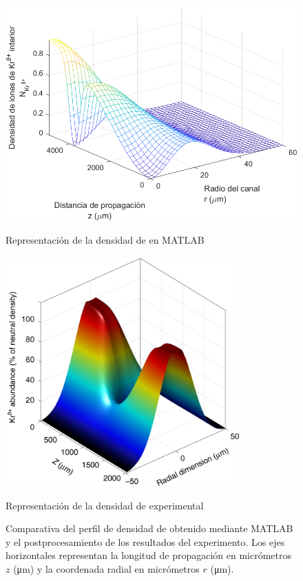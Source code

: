 \begin{figure}[htbp]
  \centering
  \begin{subcaptionblock}{.4\textwidth}
    \centering
    \includegraphics[width=\textwidth]{Figuras/ch4_krMatlab.png}
    \caption{Representación de la densidad de  en MATLAB}\label{fig:ch4_krmatlab}
  \end{subcaptionblock}
  \begin{subcaptionblock}{.4\textwidth}
    \centering
    \includegraphics[width=0.8\textwidth]{Figuras/ch4_krLOA.png}
    \caption{Representación de la densidad de  experimental\autocite{Tuitje2020}}\label{fig:ch4_krloa}
  \end{subcaptionblock}
  \caption{Comparativa del perfil de densidad de  obtenido mediante MATLAB y el postprocesamiento de los resultados del experimento\autocite{Tuitje2020}. Los ejes horizontales representan la longitud de propagación en micrómetros $z$ (\unit{\um}) y la coordenada radial en micrómetros $r$ (\unit{\um}).}
  \label{fig:4.4}
\end{figure}

